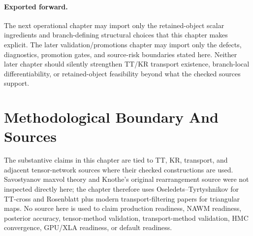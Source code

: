 \paragraph{Exported forward.}
The next operational chapter may import only the retained-object scalar
ingredients and branch-defining structural choices that this chapter makes
explicit.  The later validation/promotions chapter may import only the defects,
diagnostics, promotion gates, and source-risk boundaries stated here.  Neither
later chapter should silently strengthen TT/KR transport existence,
branch-local differentiability, or retained-object feasibility beyond what the
checked sources support.

\section{Methodological Boundary And Sources}
\label{sec:bf-hd-ptt-boundary}

The substantive claims in this chapter are tied to TT, KR, transport, and
adjacent tensor-network sources where their checked constructions are used.
Savostyanov maxvol theory and Knothe's original rearrangement source were not
inspected directly here; the chapter therefore uses Oseledets--Tyrtyshnikov for
TT-cross and Rosenblatt plus modern transport-filtering papers for triangular
maps.  No source here is used to claim production readiness, NAWM readiness,
posterior accuracy, tensor-method validation, transport-method validation, HMC
convergence, GPU/XLA readiness, or default readiness.
